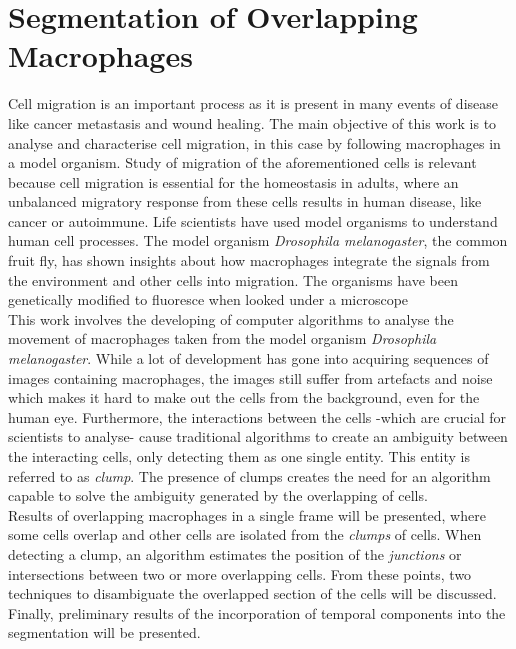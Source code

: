   \section*{Segmentation of Overlapping Macrophages}
%
Cell migration is an important process as it is present in many events of 
disease like cancer metastasis and wound healing. 
The main objective of this work is to analyse and characterise cell 
migration, in this case by following macrophages in a model organism.
Study of migration of the aforementioned cells is relevant because 
cell migration is essential for the homeostasis in adults\cite{pocha2014}, 
where an unbalanced migratory response from these cells results in 
human disease, like cancer or autoimmune.
Life scientists have used model organisms to understand human cell processes.
The model organism \emph{Drosophila melanogaster}, the common fruit fly,
has shown insights about how macrophages integrate the signals
from the environment and other cells into migration\cite{wood2017}.
The organisms have been genetically modified to fluoresce
when looked under a microscope\cite{Stramer2010}
\medskip\\
%
This work involves the developing of computer algorithms to analyse the
movement of macro\-phages taken from the model organism
\emph{Drosophila melanogaster}. While a lot of development
has gone into acquiring sequences of images containing macrophages,
the images still suffer from artefacts and noise which makes it hard to
make out the cells from the background, even for the human eye.
Furthermore, the interactions between the cells -which are crucial for scientists
to analyse- cause traditional algorithms\cite{Henry2013,lu2015,Caselles}
to create an ambiguity between the interacting cells, only detecting them 
as one single entity. This entity is referred to as \emph{clump}. 
The presence of clumps creates the need for an algorithm capable to solve 
the ambiguity generated by the overlapping of cells.
\medskip\\
%
Results of overlapping macrophages in a single frame will be
presented, where some cells overlap and other cells are
isolated from the \emph{clumps} of cells. When detecting a clump,
an algorithm estimates the position of the \emph{junctions} or intersections
between two or more overlapping cells. From these points, two techniques
to disambiguate the overlapped section of the cells will be discussed.
Finally, preliminary results of the incorporation of temporal components
into the segmentation will be presented. 
